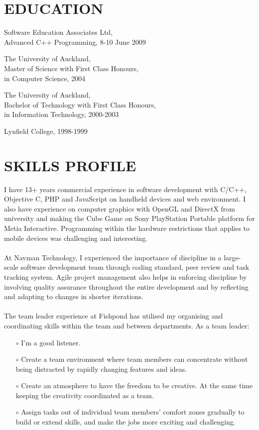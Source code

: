 \begin{resume}
\vspace{0.1in}

\section{EDUCATION}
\vspace{0.1in} 
Software Education Associates Ltd,\\
Advanced C++ Programming, 8-10 June 2009

The University of Auckland,\\
Master of Science with First Class Honours,\\
in Computer Science, 2004 
 
The University of Auckland,\\
Bachelor of Technology with First Class Honours,\\
in Information Technology, 2000-2003 
 
Lynfield College, 1998-1999 
 
\section{SKILLS PROFILE} 
\vspace{0.1in}

I have 13+ years commercial experience in software development with C/C++, Objective C, PHP and JavaScript on handheld devices and web environment. I also have experience on computer graphics with OpenGL and DirectX from university and making the Cube Game on Sony PlayStation Portable platform for Metia Interactive. Programming within the hardware restrictions that applies to mobile devices was challenging and interesting.
\\\\
At Navman Technology, I experienced the importance of discipline in a large-scale software development team through coding standard, peer review and task tracking system. Agile project management also helps in enforcing discipline by involving quality assurance throughout the entire development and by reflecting and adapting to changes in shorter iterations.
\\\\
The team leader experience at Fishpond has utilised my organising and coordinating skills within the team and between departments. As a team leader: \\
\begin{itemize}
\item[$\circ$] I'm a good listener.
\item[$\circ$] Create a team environment where team members can concentrate without being distracted by rapidly changing features and ideas.
\item[$\circ$] Create an atmosphere to have the freedom to be creative. At the same time keeping the creativity coordinated as a team.
\item[$\circ$] Assign tasks out of individual team members' comfort zones gradually to build or extend skills, and make the jobs more exciting and challenging.\\
\end{itemize}


\end{resume}
